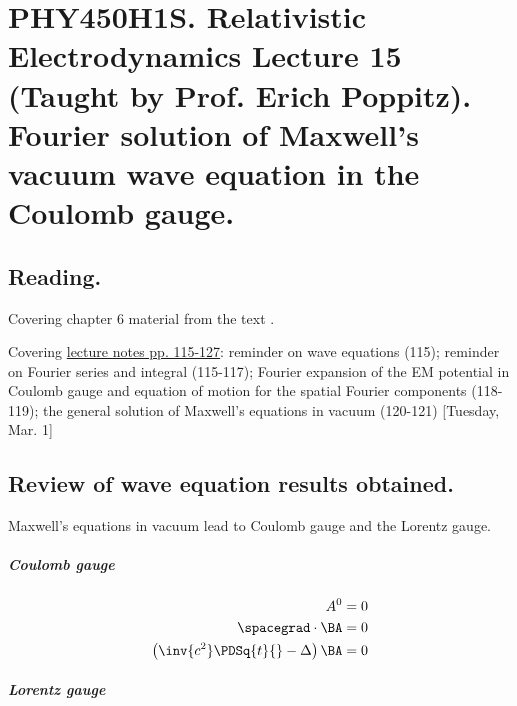 
%

\chapter{PHY450H1S.  Relativistic Electrodynamics Lecture 15 (Taught by Prof. Erich Poppitz).  Fourier solution of Maxwell's vacuum wave equation in the Coulomb gauge.}
\label{chap:relativisticElectrodynamicsL15}
{}
\date{Mar 1, 2011}

\beginArtNoToc

\section{Reading.}

Covering chapter 6 material from the text \cite{landau1980classical}.

Covering \href{http://www.physics.utoronto.ca/~poppitz/e-poppitz/PHY450_files/RelEMpp115-127.pdf}{lecture notes pp. 115-127}: reminder on wave equations (115); reminder on Fourier series and integral (115-117); Fourier expansion of the EM potential in Coulomb gauge and equation of motion for the spatial Fourier components (118-119); the general solution of Maxwell's equations in vacuum (120-121) [Tuesday, Mar. 1]

\section{Review of wave equation results obtained.}

Maxwell's equations in vacuum lead to Coulomb gauge and the Lorentz gauge.

\paragraph{Coulomb gauge}

\begin{align}\label{eqn:relativisticElectrodynamicsL15:10}
A^0 &= 0 \\
\spacegrad \cdot \BA &= 0 \\
\left( \inv{c^2} \PDSq{t}{} - \Delta \right) \BA &= 0
\end{align}

\paragraph{Lorentz gauge}

